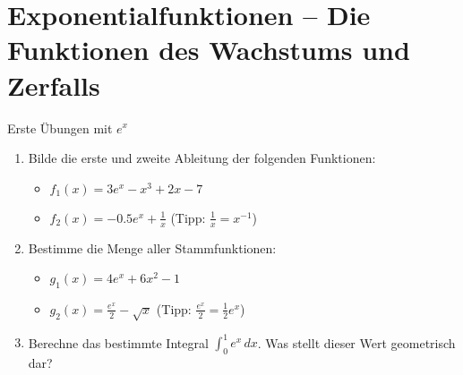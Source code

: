 \section{Exponentialfunktionen – Die Funktionen des Wachstums und Zerfalls}
\label{sec:exponentialfunktionen_intro}


\begin{aufgabenumgebung}{Erste Übungen mit $e^x$}
\begin{enumerate}
    \item Bilde die erste und zweite Ableitung der folgenden Funktionen:
        \begin{itemize}
            \item $f_1(x) = 3e^x - x^3 + 2x - 7$
            \item $f_2(x) = -0.5e^x + \frac{1}{x}$ (Tipp: $\frac{1}{x} = x^{-1}$)
        \end{itemize}
    \item Bestimme die Menge aller Stammfunktionen:
        \begin{itemize}
            \item $g_1(x) = 4e^x + 6x^2 - 1$
            \item $g_2(x) = \frac{e^x}{2} - \sqrt{x}$ (Tipp: $\frac{e^x}{2} = \frac{1}{2}e^x$)
        \end{itemize}
    \item Berechne das bestimmte Integral $\int_0^1 e^x \,dx$. Was stellt dieser Wert geometrisch dar?
\end{enumerate}
\end{aufgabenumgebung}

